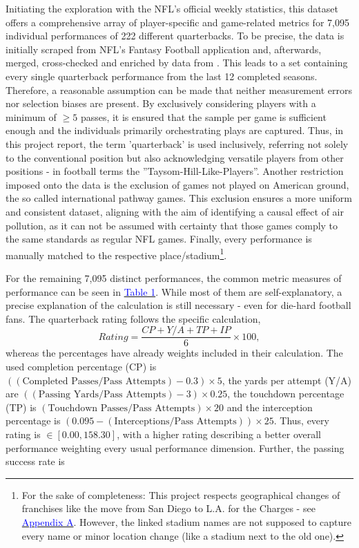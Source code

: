 \documentclass[12pt,a4paper]{article}
\newcommand{\mylink}[2]{\hyperref[#1]{\textcolor{blue}{#2}}}
\begin{document}
Initiating the exploration with the NFL's official weekly statistics, this dataset offers a comprehensive array of player-specific and game-related metrics for 7,095 individual performances of 222 different quarterbacks. To be precise, the data is initially scraped from NFL's Fantasy Football application and, afterwards, merged, cross-checked and enriched by data from \citeauthor{Stathead}. This leads to a set containing every single quarterback performance from the last 12 completed seasons. Therefore, a reasonable assumption can be made that neither measurement errors nor selection biases are present. By exclusively considering players with a minimum of $\geq 5$ passes, it is ensured that the sample per game is sufficient enough and the individuals primarily orchestrating plays are captured. Thus, in this project report, the term 'quarterback' is used inclusively, referring not solely to the conventional position but also acknowledging versatile players from other positions - in football terms the ''Taysom-Hill-Like-Players''. Another restriction imposed onto the data is the exclusion of games not played on American ground, the so called  international pathway games. This exclusion ensures a more uniform and consistent dataset, aligning with the aim of identifying a causal effect of air pollution, as it can not be assumed with certainty that those games comply to the same standards as regular NFL games. Finally, every performance is manually matched to the respective place/stadium\footnote{For the sake of completeness: This project respects geographical changes of franchises like the move from San Diego to L.A. for the Charges - see \mylink{AppF:1}{Appendix A}. However, the linked stadium names are not supposed to capture every name or minor location change (like a stadium next to the old one).}. 

For the remaining 7,095 distinct performances, the common metric measures of performance can be seen in \mylink{tab:1}{Table 1}. While most of them are self-explanatory, a precise explanation of the calculation is still necessary - even for die-hard football fans. The quarterback rating follows the specific calculation, 
\begin{equation}
Rating = \dfrac{CP + Y/A + TP + IP}{6} \times 100,
\end{equation}
whereas the percentages have already weights included in their calculation. The used completion percentage (CP) is $ ((\textrm{Completed Passes} / \textrm{Pass Attempts}) - 0.3) \times 5$, the yards per attempt (Y/A) are $((\textrm{Passing Yards} / \textrm{Pass Attempts}) - 3) \times 0.25$, the touchdown percentage (TP) is $(\textrm{Touchdown Passes} / \textrm{Pass Attempts}) \times 20$ and the interception percentage is  $(0.095 - (\textrm{Interceptions} / \textrm{Pass Attempts})) \times 25$. Thus, every rating is $ \in [ 0.00 ,158.30 ]$, with a higher rating describing a better overall performance weighting every usual performance dimension. Further, the passing success rate is 
\end{document}
